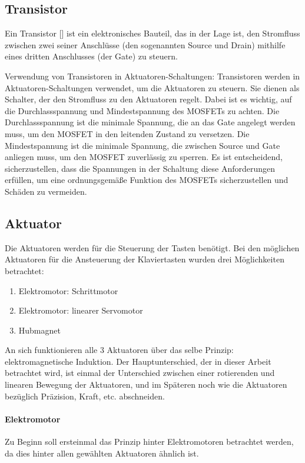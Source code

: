 \subsection{Transistor}
Ein Transistor [\cite*[siehe ]{BipolarerTransistor}] ist ein elektronisches Bauteil, das in der Lage ist, den Stromfluss zwischen zwei seiner Anschlüsse
(den sogenannten Source und Drain) mithilfe eines dritten Anschlusses (der Gate) zu steuern.

Verwendung von Transistoren in Aktuatoren-Schaltungen:
Transistoren werden in Aktuatoren-Schaltungen verwendet, um die Aktuatoren
zu steuern. Sie dienen als Schalter, der den Stromfluss zu den Aktuatoren regelt.
Dabei ist es wichtig, auf die Durchlassspannung und Mindestspannung des MOSFETs zu achten. Die Durchlassspannung ist die
minimale Spannung, die an das Gate angelegt werden muss, um den MOSFET in den leitenden Zustand zu versetzen. Die
Mindestspannung ist die minimale Spannung, die zwischen Source und Gate anliegen muss, um den MOSFET zuverlässig zu
sperren.
Es ist entscheidend, sicherzustellen, dass die Spannungen in der Schaltung diese Anforderungen erfüllen, um
eine ordnungsgemäße Funktion des MOSFETs sicherzustellen und Schäden zu vermeiden.


\subsection{Aktuator}\label{subsec:aktuator}

Die Aktuatoren werden für die Steuerung der Tasten benötigt.
Bei den möglichen Aktuatoren für die Ansteuerung der Klaviertasten wurden drei Möglichkeiten betrachtet:
\begin{enumerate}
	\item Elektromotor: Schrittmotor
	\item Elektromotor: linearer Servomotor
	\item Hubmagnet
\end{enumerate}

An sich funktionieren alle 3 Aktuatoren über das selbe Prinzip: elektromagnetische Induktion.
Der Hauptunterschied, der in dieser Arbeit betrachtet wird, ist einmal der Unterschied zwischen einer rotierenden und linearen Bewegung der Aktuatoren,
und im Späteren noch wie die Aktuatoren bezüglich Präzision, Kraft, etc. abschneiden.

\paragraph{Elektromotor}
Zu Beginn soll ersteinmal das Prinzip hinter Elektromotoren betrachtet werden, da dies hinter allen gewählten Aktuatoren ähnlich ist.

